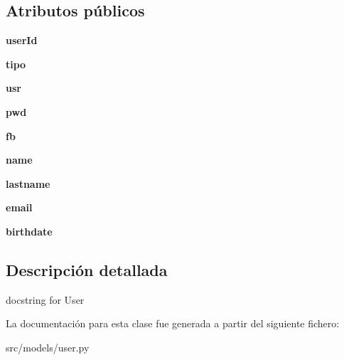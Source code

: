 \subsection*{Atributos públicos}
\begin{DoxyCompactItemize}
\item 
\hypertarget{classsrc_1_1models_1_1user_1_1_user_a2a6520a054dbf86c2b8b95cc2bddd485}{{\bfseries user\-Id}}\label{classsrc_1_1models_1_1user_1_1_user_a2a6520a054dbf86c2b8b95cc2bddd485}

\item 
\hypertarget{classsrc_1_1models_1_1user_1_1_user_a8c48786e6e354ab921618a995b7a3644}{{\bfseries tipo}}\label{classsrc_1_1models_1_1user_1_1_user_a8c48786e6e354ab921618a995b7a3644}

\item 
\hypertarget{classsrc_1_1models_1_1user_1_1_user_a9f71617c28c98830fc5ab3c759cf7a1d}{{\bfseries usr}}\label{classsrc_1_1models_1_1user_1_1_user_a9f71617c28c98830fc5ab3c759cf7a1d}

\item 
\hypertarget{classsrc_1_1models_1_1user_1_1_user_ae94bf8f97ad07d3938e4f0f2839a0f45}{{\bfseries pwd}}\label{classsrc_1_1models_1_1user_1_1_user_ae94bf8f97ad07d3938e4f0f2839a0f45}

\item 
\hypertarget{classsrc_1_1models_1_1user_1_1_user_a0860e9aa254a148eb3cfefca4d495a9d}{{\bfseries fb}}\label{classsrc_1_1models_1_1user_1_1_user_a0860e9aa254a148eb3cfefca4d495a9d}

\item 
\hypertarget{classsrc_1_1models_1_1user_1_1_user_a891a862565bbc72c7f514c41e67ce692}{{\bfseries name}}\label{classsrc_1_1models_1_1user_1_1_user_a891a862565bbc72c7f514c41e67ce692}

\item 
\hypertarget{classsrc_1_1models_1_1user_1_1_user_a2681cfd922c69240eb6e27822a365b6a}{{\bfseries lastname}}\label{classsrc_1_1models_1_1user_1_1_user_a2681cfd922c69240eb6e27822a365b6a}

\item 
\hypertarget{classsrc_1_1models_1_1user_1_1_user_a32e1ec8137a307663b5041f97122031d}{{\bfseries email}}\label{classsrc_1_1models_1_1user_1_1_user_a32e1ec8137a307663b5041f97122031d}

\item 
\hypertarget{classsrc_1_1models_1_1user_1_1_user_a8c53cca4fcf93a9aae21f91de418b032}{{\bfseries birthdate}}\label{classsrc_1_1models_1_1user_1_1_user_a8c53cca4fcf93a9aae21f91de418b032}

\end{DoxyCompactItemize}


\subsection{Descripción detallada}
\begin{DoxyVerb}docstring for User\end{DoxyVerb}
 

La documentación para esta clase fue generada a partir del siguiente fichero\-:\begin{DoxyCompactItemize}
\item 
src/models/user.\-py\end{DoxyCompactItemize}
